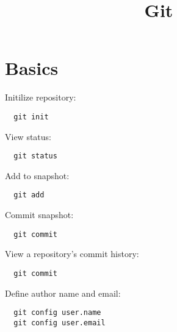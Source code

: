 \documentclass[french]{article}
\title{Git}
\begin{document}
\date{}

\maketitle

\setlength{\parindent}{0cm}

\section{Basics}

Initilize repository:
\begin{verbatim}
  git init
\end{verbatim}

View status:
\begin{verbatim}
  git status
\end{verbatim}

Add to snapshot:
\begin{verbatim}
  git add
\end{verbatim}

Commit snapshot:
\begin{verbatim}
  git commit 
\end{verbatim}

View a repository's commit history:
\begin{verbatim}
  git commit 
\end{verbatim}

Define author name and email:
\begin{verbatim}
  git config user.name
  git config user.email
\end{verbatim}
\end{document}
